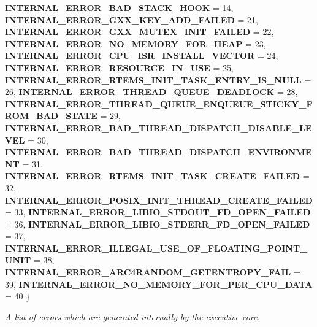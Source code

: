 \begin{DoxyCompactItemize}
{\bfseries I\+N\+T\+E\+R\+N\+A\+L\+\_\+\+E\+R\+R\+O\+R\+\_\+\+B\+A\+D\+\_\+\+S\+T\+A\+C\+K\+\_\+\+H\+O\+OK} = 14, 
{\bfseries I\+N\+T\+E\+R\+N\+A\+L\+\_\+\+E\+R\+R\+O\+R\+\_\+\+G\+X\+X\+\_\+\+K\+E\+Y\+\_\+\+A\+D\+D\+\_\+\+F\+A\+I\+L\+ED} = 21, 
\newline
{\bfseries I\+N\+T\+E\+R\+N\+A\+L\+\_\+\+E\+R\+R\+O\+R\+\_\+\+G\+X\+X\+\_\+\+M\+U\+T\+E\+X\+\_\+\+I\+N\+I\+T\+\_\+\+F\+A\+I\+L\+ED} = 22, 
{\bfseries I\+N\+T\+E\+R\+N\+A\+L\+\_\+\+E\+R\+R\+O\+R\+\_\+\+N\+O\+\_\+\+M\+E\+M\+O\+R\+Y\+\_\+\+F\+O\+R\+\_\+\+H\+E\+AP} = 23, 
{\bfseries I\+N\+T\+E\+R\+N\+A\+L\+\_\+\+E\+R\+R\+O\+R\+\_\+\+C\+P\+U\+\_\+\+I\+S\+R\+\_\+\+I\+N\+S\+T\+A\+L\+L\+\_\+\+V\+E\+C\+T\+OR} = 24, 
{\bfseries I\+N\+T\+E\+R\+N\+A\+L\+\_\+\+E\+R\+R\+O\+R\+\_\+\+R\+E\+S\+O\+U\+R\+C\+E\+\_\+\+I\+N\+\_\+\+U\+SE} = 25, 
\newline
{\bfseries I\+N\+T\+E\+R\+N\+A\+L\+\_\+\+E\+R\+R\+O\+R\+\_\+\+R\+T\+E\+M\+S\+\_\+\+I\+N\+I\+T\+\_\+\+T\+A\+S\+K\+\_\+\+E\+N\+T\+R\+Y\+\_\+\+I\+S\+\_\+\+N\+U\+LL} = 26, 
{\bfseries I\+N\+T\+E\+R\+N\+A\+L\+\_\+\+E\+R\+R\+O\+R\+\_\+\+T\+H\+R\+E\+A\+D\+\_\+\+Q\+U\+E\+U\+E\+\_\+\+D\+E\+A\+D\+L\+O\+CK} = 28, 
{\bfseries I\+N\+T\+E\+R\+N\+A\+L\+\_\+\+E\+R\+R\+O\+R\+\_\+\+T\+H\+R\+E\+A\+D\+\_\+\+Q\+U\+E\+U\+E\+\_\+\+E\+N\+Q\+U\+E\+U\+E\+\_\+\+S\+T\+I\+C\+K\+Y\+\_\+\+F\+R\+O\+M\+\_\+\+B\+A\+D\+\_\+\+S\+T\+A\+TE} = 29, 
{\bfseries I\+N\+T\+E\+R\+N\+A\+L\+\_\+\+E\+R\+R\+O\+R\+\_\+\+B\+A\+D\+\_\+\+T\+H\+R\+E\+A\+D\+\_\+\+D\+I\+S\+P\+A\+T\+C\+H\+\_\+\+D\+I\+S\+A\+B\+L\+E\+\_\+\+L\+E\+V\+EL} = 30, 
\newline
{\bfseries I\+N\+T\+E\+R\+N\+A\+L\+\_\+\+E\+R\+R\+O\+R\+\_\+\+B\+A\+D\+\_\+\+T\+H\+R\+E\+A\+D\+\_\+\+D\+I\+S\+P\+A\+T\+C\+H\+\_\+\+E\+N\+V\+I\+R\+O\+N\+M\+E\+NT} = 31, 
{\bfseries I\+N\+T\+E\+R\+N\+A\+L\+\_\+\+E\+R\+R\+O\+R\+\_\+\+R\+T\+E\+M\+S\+\_\+\+I\+N\+I\+T\+\_\+\+T\+A\+S\+K\+\_\+\+C\+R\+E\+A\+T\+E\+\_\+\+F\+A\+I\+L\+ED} = 32, 
{\bfseries I\+N\+T\+E\+R\+N\+A\+L\+\_\+\+E\+R\+R\+O\+R\+\_\+\+P\+O\+S\+I\+X\+\_\+\+I\+N\+I\+T\+\_\+\+T\+H\+R\+E\+A\+D\+\_\+\+C\+R\+E\+A\+T\+E\+\_\+\+F\+A\+I\+L\+ED} = 33, 
{\bfseries I\+N\+T\+E\+R\+N\+A\+L\+\_\+\+E\+R\+R\+O\+R\+\_\+\+L\+I\+B\+I\+O\+\_\+\+S\+T\+D\+O\+U\+T\+\_\+\+F\+D\+\_\+\+O\+P\+E\+N\+\_\+\+F\+A\+I\+L\+ED} = 36, 
\newline
{\bfseries I\+N\+T\+E\+R\+N\+A\+L\+\_\+\+E\+R\+R\+O\+R\+\_\+\+L\+I\+B\+I\+O\+\_\+\+S\+T\+D\+E\+R\+R\+\_\+\+F\+D\+\_\+\+O\+P\+E\+N\+\_\+\+F\+A\+I\+L\+ED} = 37, 
{\bfseries I\+N\+T\+E\+R\+N\+A\+L\+\_\+\+E\+R\+R\+O\+R\+\_\+\+I\+L\+L\+E\+G\+A\+L\+\_\+\+U\+S\+E\+\_\+\+O\+F\+\_\+\+F\+L\+O\+A\+T\+I\+N\+G\+\_\+\+P\+O\+I\+N\+T\+\_\+\+U\+N\+IT} = 38, 
{\bfseries I\+N\+T\+E\+R\+N\+A\+L\+\_\+\+E\+R\+R\+O\+R\+\_\+\+A\+R\+C4\+R\+A\+N\+D\+O\+M\+\_\+\+G\+E\+T\+E\+N\+T\+R\+O\+P\+Y\+\_\+\+F\+A\+IL} = 39, 
{\bfseries I\+N\+T\+E\+R\+N\+A\+L\+\_\+\+E\+R\+R\+O\+R\+\_\+\+N\+O\+\_\+\+M\+E\+M\+O\+R\+Y\+\_\+\+F\+O\+R\+\_\+\+P\+E\+R\+\_\+\+C\+P\+U\+\_\+\+D\+A\+TA} = 40
 \}
\begin{DoxyCompactList}\small\item\em A list of errors which are generated internally by the executive core. \end{DoxyCompactList}\end{DoxyCompactItemize}
